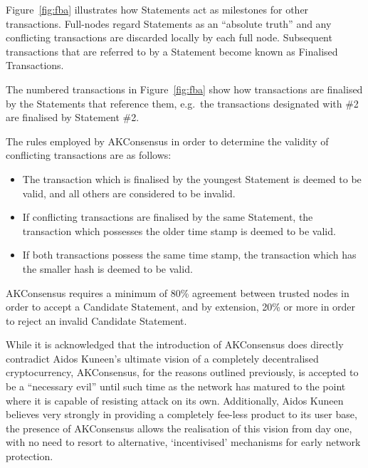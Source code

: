 \documentclass[a4paper,10pt,twocolumn]{article}
\begin{document}
	\vspace{-3.5mm}
	
	Figure~\ref{fig:fba} illustrates how Statements act as milestones for other transactions.
	Full-nodes regard Statements as an ``absolute truth'' and any conflicting transactions are discarded locally by each full node. 
	Subsequent transactions that are referred to by a Statement become known as Finalised Transactions.
	
	\vspace{2.5mm}
	
	The numbered transactions in Figure~\ref{fig:fba} show how transactions are finalised by the Statements that reference them,
	e.g.\ the transactions designated with \#2 are finalised by Statement \#2.
	
	\vspace{2.5mm}
	
	The rules employed by AKConsensus in order to determine the validity of conflicting transactions are as follows:
	
	\begin{itemize}
		\item The transaction which is finalised by the youngest Statement is deemed to be valid, and all others are considered to be invalid.
		\item If conflicting transactions are finalised by the same Statement, the transaction which possesses the older time stamp is deemed 
		to be valid.
		\item If both transactions possess the same time stamp, the transaction which has the smaller hash is deemed to be valid.
	\end{itemize}
	
	AKConsensus requires a minimum of 80\% agreement between trusted nodes in order to accept a Candidate Statement, and by extension, 
	20\% or more in order to reject an invalid Candidate Statement.
	
	\vspace{2.5mm}
	
	While it is acknowledged that the introduction of AKConsensus does directly contradict Aidos Kuneen's ultimate 
	vision of a completely decentralised cryptocurrency, AKConsensus, for the reasons outlined previously, is accepted to be a
	``necessary evil'' until such time as the network has matured to the point where it is capable of resisting attack on its own. 
	Additionally, Aidos Kuneen believes very strongly in providing a completely fee-less product to its user base,
	the presence of AKConsensus allows the realisation of this vision from day one, with no need to resort to alternative, `incentivised' 
	mechanisms for early network protection.
	
\end{document}
